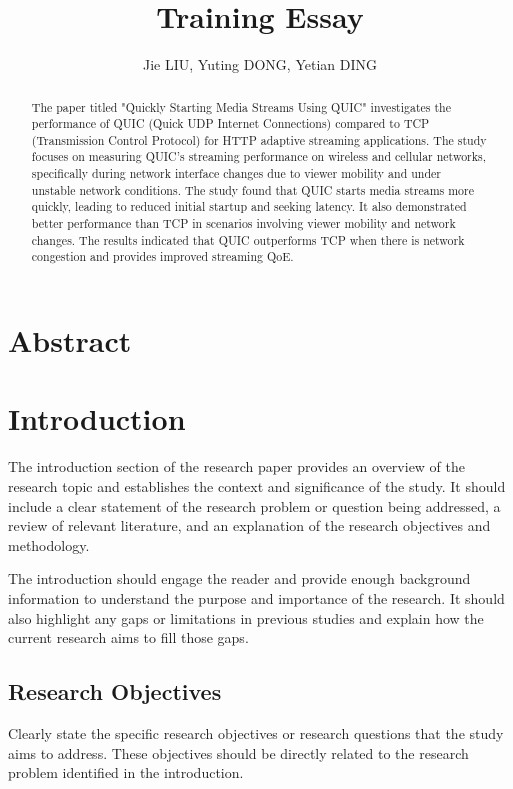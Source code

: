 \documentclass{article}
\title{Training Essay}
\author{Jie LIU, Yuting DONG, Yetian DING}
\begin{document}
\maketitle

\section*{Abstract}
\begin{abstract}
The paper titled "Quickly Starting Media Streams Using QUIC" investigates the performance of QUIC (Quick UDP Internet Connections) compared to TCP (Transmission Control Protocol) for HTTP adaptive streaming applications. The study focuses on measuring QUIC's streaming performance on wireless and cellular networks, specifically during network interface changes due to viewer mobility and under unstable network conditions.
The study found that QUIC starts media streams more quickly, leading to reduced initial startup and seeking latency. It also demonstrated better performance than TCP in scenarios involving viewer mobility and network changes. The results indicated that QUIC outperforms TCP when there is network congestion and provides improved streaming QoE.
\end{abstract}

\section{Introduction}
The introduction section of the research paper provides an overview of the research topic and establishes the context and significance of the study. It should include a clear statement of the research problem or question being addressed, a review of relevant literature, and an explanation of the research objectives and methodology.

The introduction should engage the reader and provide enough background information to understand the purpose and importance of the research. It should also highlight any gaps or limitations in previous studies and explain how the current research aims to fill those gaps.

\subsection{Research Objectives}
Clearly state the specific research objectives or research questions that the study aims to address. These objectives should be directly related to the research problem identified in the introduction.
\end{document}
